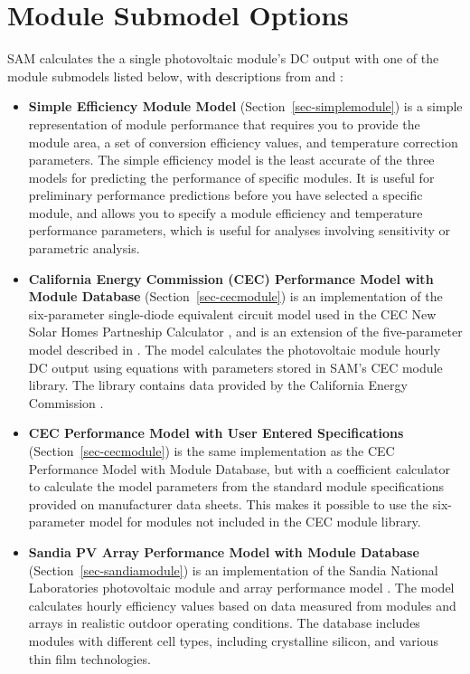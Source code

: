 \documentclass[12pt,letterpaper]{article}
\begin{document}
\section{Module Submodel Options}\label{sec-moduleoptions}

SAM calculates the a single photovoltaic module's DC output with one of the module submodels listed below, with descriptions from \citet{help-module} and \citet{blair2013}:

\begin{itemize}
\item \textbf{Simple Efficiency Module Model} (Section~\ref{sec-simplemodule}) is a simple representation of module performance that requires you to provide the module area, a set of conversion efficiency values, and temperature correction parameters. The simple efficiency model is the least accurate of the three models for predicting the performance of specific modules. It is useful for preliminary performance predictions before you have selected a specific module, and allows you to specify a module efficiency and temperature performance parameters, which is useful for analyses involving sensitivity or parametric analysis.
\item \textbf{California Energy Commission (CEC) Performance Model with Module Database} (Section~\ref{sec-cecmodule}) is an implementation of the six-parameter single-diode equivalent circuit model used in the CEC New Solar Homes Partneship Calculator \citep{gsc2014a}, and is an extension of the five-parameter model described in \citet{desoto2004a}. The model calculates the photovoltaic module hourly DC output using equations with parameters stored in SAM's CEC module library. The library contains data provided by the California Energy Commission \citep{gsc2014a} \citep{gsc2014b}.
\item \textbf{CEC Performance Model with User Entered Specifications}  (Section~\ref{sec-cecmodule}) is the same implementation as the CEC Performance Model with Module Database, but with a coefficient calculator \citep{dobos2012a} to calculate the model parameters from the standard module specifications provided on manufacturer data sheets. This makes it possible to use the six-parameter model for modules not included in the CEC module library.
\item \textbf{Sandia PV Array Performance Model with Module Database}  (Section~\ref{sec-sandiamodule}) is an implementation of the Sandia National Laboratories photovoltaic module and array performance model \citep{king2004}. The model calculates hourly efficiency values based on data measured from modules and arrays in realistic outdoor operating conditions. The database includes modules with different cell types, including crystalline silicon, and various thin film technologies.
\end{itemize}
\end{document}
